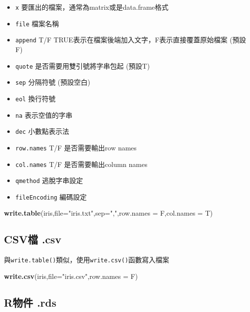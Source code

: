 \documentclass[]{book}
\newenvironment{Shaded}{\begin{snugshade}}{\end{snugshade}}
\newcommand{\KeywordTok}[1]{\textcolor[rgb]{0.13,0.29,0.53}{\textbf{{#1}}}}
\newcommand{\DataTypeTok}[1]{\textcolor[rgb]{0.13,0.29,0.53}{{#1}}}
\newcommand{\StringTok}[1]{\textcolor[rgb]{0.31,0.60,0.02}{{#1}}}
\newcommand{\NormalTok}[1]{{#1}}
\providecommand{\tightlist}{%
  \setlength{\itemsep}{0pt}\setlength{\parskip}{0pt}}
\theoremstyle{definition}
\theoremstyle{definition}
\theoremstyle{remark}
\begin{document}
\begin{itemize}
\tightlist
\item
  \texttt{x} 要匯出的檔案，通常為matrix或是data.frame格式
\item
  \texttt{file} 檔案名稱
\item
  \texttt{append} T/F TRUE表示在檔案後端加入文字，F表示直接覆蓋原始檔案
  (預設F)
\item
  \texttt{quote} 是否需要用雙引號將字串包起 (預設T)
\item
  \texttt{sep} 分隔符號 (預設空白)
\item
  \texttt{eol} 換行符號
\item
  \texttt{na} 表示空值的字串
\item
  \texttt{dec} 小數點表示法
\item
  \texttt{row.names} T/F 是否需要輸出row names
\item
  \texttt{col.names} T/F 是否需要輸出column names
\item
  \texttt{qmethod} 逃脫字串設定
\item
  \texttt{fileEncoding} 編碼設定
\end{itemize}

\begin{Shaded}
\begin{Highlighting}[]
\KeywordTok{write.table}\NormalTok{(iris,}\DataTypeTok{file=}\StringTok{"iris.txt"}\NormalTok{,}\DataTypeTok{sep=}\StringTok{","}\NormalTok{,}\DataTypeTok{row.names =} \NormalTok{F,}\DataTypeTok{col.names =} \NormalTok{T)}
\end{Highlighting}
\end{Shaded}

\subsection{CSV檔 .csv}\label{csv-.csv}

與\texttt{write.table()}類似，使用\texttt{write.csv()}函數寫入檔案

\begin{Shaded}
\begin{Highlighting}[]
\KeywordTok{write.csv}\NormalTok{(iris,}\DataTypeTok{file=}\StringTok{"iris.csv"}\NormalTok{,}\DataTypeTok{row.names =} \NormalTok{F)}
\end{Highlighting}
\end{Shaded}

\subsection{R物件 .rds}\label{r-.rds-1}
\end{document}
